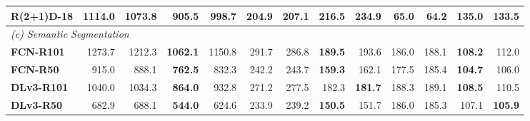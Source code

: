 \begin{table}[t]
{\begin{tabular}{lrrrrrrrrrrrr}
\textbf{R(2+1)D-18} & 1114.0 & 1073.8 & \cellcolor{green!15}\textbf{905.5} & 998.7 & \cellcolor{green!15}\textbf{204.9} & 207.1 & 216.5 & 234.9 & 65.0 & \cellcolor{green!15}\textbf{64.2} & 135.0 & 133.5 \\
\midrule
\multicolumn{13}{l}{\textit{(c) Semantic Segmentation}} \\
\midrule
\textbf{FCN-R101} & 1273.7 & 1212.3 & \cellcolor{green!15}\textbf{1062.1} & 1150.8 & 291.7 & 286.8 & \cellcolor{green!15}\textbf{189.5} & 193.6 & 186.0 & 188.1 & \cellcolor{green!15}\textbf{108.2} & 112.0 \\
\textbf{FCN-R50} & 915.0 & 888.1 & \cellcolor{green!15}\textbf{762.5} & 832.3 & 242.2 & 243.7 & \cellcolor{green!15}\textbf{159.3} & 162.1 & 177.5 & 185.4 & \cellcolor{green!15}\textbf{104.7} & 106.0 \\
\textbf{DLv3-R101} & 1040.0 & 1034.3 & \cellcolor{green!15}\textbf{864.0} & 932.8 & 271.2 & 277.5 & 182.3 & \cellcolor{green!15}\textbf{181.7} & 188.3 & 189.1 & \cellcolor{green!15}\textbf{108.5} & 110.5 \\
\textbf{DLv3-R50} & 682.9 & 688.1 & \cellcolor{green!15}\textbf{544.0} & 624.6 & 233.9 & 239.2 & \cellcolor{green!15}\textbf{150.5} & 151.7 & 186.0 & 185.3 & 107.1 & \cellcolor{green!15}\textbf{105.9} \\
\bottomrule
\end{tabular}%
}
\end{table}
